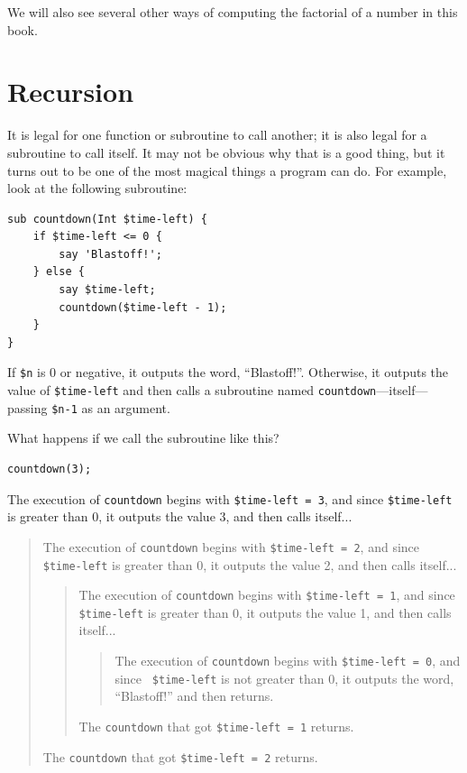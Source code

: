We will also see several other ways of computing the factorial 
of a number in this book.

\section{Recursion}
\label{recursion}

It is legal for one function or subroutine to call another;
it is also legal for a subroutine to call itself.  It may not 
be obvious why that is a good thing, but it turns out to be 
one of the most magical things a program can do. 
For example, look at the following subroutine:

\begin{verbatim}
sub countdown(Int $time-left) {
    if $time-left <= 0 {
        say 'Blastoff!';
    } else {
        say $time-left;
        countdown($time-left - 1);
    }
}
\end{verbatim}
%
If {\tt \$n} is 0 or negative, it outputs the word, 
``Blastoff!''. Otherwise, it outputs the value of 
{\tt \$time-left} and then calls a subroutine named 
{\tt countdown}---itself---passing {\tt \$n-1} as an argument.

What happens if we call the subroutine like this?

\begin{verbatim}
countdown(3);
\end{verbatim}
%
The execution of {\tt countdown} begins with {\tt \$time-left 
= 3}, and since {\tt \$time-left} is greater than 0, it 
outputs the value 3, and then calls itself...

\begin{quote}
The execution of {\tt countdown} begins with {\tt \$time-left = 2}, and since
{\tt \$time-left} is greater than 0, it outputs the value 2, and then calls itself...

\begin{quote}
The execution of {\tt countdown} begins with {\tt \$time-left = 1}, and since
{\tt \$time-left} is greater than 0, it outputs the value 1, and then calls itself...

\begin{quote}
The execution of {\tt countdown} begins with {\tt \$time-left = 0}, and since {\tt
\$time-left} is not greater than 0, it outputs the word, ``Blastoff!'' and then
returns.
\end{quote}

The {\tt countdown} that got {\tt \$time-left = 1} returns.
\end{quote}

The {\tt countdown} that got {\tt \$time-left = 2} returns.
\end{quote}

